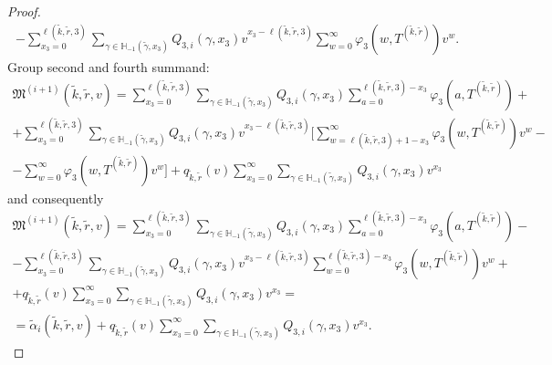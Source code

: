 \documentclass[runningheads,a4paper]{llncs}
\begin{document}
\begin{proof}
\begin{multline*}
- \sum_{x_3=0}^{\ell(\tilde{k},\tilde{r},3)} \sum_{\gamma \in {\mathbb H}_{-1}(\tilde{\gamma},x_3)} Q_{3,i}(\gamma,x_3) v^{x_3-\ell(\tilde{k},\tilde{r},3)}\sum_{w=0}^{\infty}  
\varphi_3(w,T^{(\tilde{k},\tilde{r})}) v^w.
\end{multline*}
Group second and fourth summand:
\begin{multline*}
\mathfrak{M}^{(i+1)}(\tilde{k},\tilde{r},v)= \sum_{x_3=0}^{\ell(\tilde{k},\tilde{r},3)}\sum_{\gamma \in {\mathbb H}_{-1}(\tilde{\gamma},x_3)} Q_{3,i}(\gamma,x_3) \sum_{a=0}^{\ell(\tilde{k},\tilde{r},3) - x_3} \varphi_3(a,T^{(\tilde{k},\tilde{r})}) + \\
+ \sum_{x_3=0}^{\ell(\tilde{k},\tilde{r},3)}  \sum_{\gamma \in {\mathbb H}_{-1}(\tilde{\gamma},x_3)} Q_{3,i}(\gamma,x_3) v^{x_3-\ell(\tilde{k},\tilde{r},3)}  [ \sum_{w=\ell(\tilde{k},\tilde{r},3) + 1 -x_3}^{\infty}
\varphi_3(w,T^{(\tilde{k},\tilde{r})}) v^w - \\ - \sum_{w=0}^{\infty} 
\varphi_3(w,T^{(\tilde{k},\tilde{r})}) v^w ] 
+ q_{\tilde{k},\tilde{r}}(v) \sum_{x_3=0}^{\infty} \sum_{\gamma \in {\mathbb H}_{-1}(\tilde{\gamma},x_3)} Q_{3,i}(\gamma,x_3) v^{x_3}
\end{multline*}
and consequently 
\begin{multline}
\mathfrak{M}^{(i+1)}(\tilde{k},\tilde{r},v)= \sum_{x_3=0}^{\ell(\tilde{k},\tilde{r},3)}\sum_{\gamma \in {\mathbb H}_{-1}(\tilde{\gamma},x_3)} Q_{3,i}(\gamma,x_3) \sum_{a=0}^{\ell(\tilde{k},\tilde{r},3) - x_3} \varphi_3(a,T^{(\tilde{k},\tilde{r})}) - \\
-\sum_{x_3=0}^{\ell(\tilde{k},\tilde{r},3)}  \sum_{\gamma \in {\mathbb H}_{-1}(\tilde{\gamma},x_3)} Q_{3,i}(\gamma,x_3) v^{x_3-\ell(\tilde{k},\tilde{r},3)}   \sum_{w=0}^{\ell(\tilde{k},\tilde{r},3) -x_3}
\varphi_3(w,T^{(\tilde{k},\tilde{r})}) v^w   +\\
+ q_{\tilde{k},\tilde{r}}(v) \sum_{x_3=0}^{\infty} \sum_{\gamma \in {\mathbb H}_{-1}(\tilde{\gamma},x_3)} Q_{3,i}(\gamma,x_3) v^{x_3} =\\= \tilde{\alpha}_i(\tilde{k},\tilde{r},v) + q_{\tilde{k},\tilde{r}}(v) \sum_{x_3=0}^{\infty} \sum_{\gamma \in {\mathbb H}_{-1}(\tilde{\gamma},x_3)} Q_{3,i}(\gamma,x_3) v^{x_3}.
\label{rekur:general:second}
\end{multline}


\end{proof}
\end{document}
